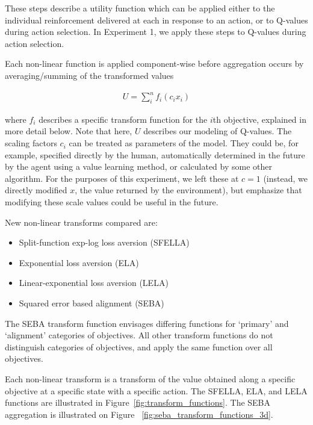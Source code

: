 These steps describe a utility function which can be applied either to the individual reinforcement delivered at each in response to an action, or to Q-values during action selection. In Experiment 1, we apply these steps to Q-values during action selection.

Each non-linear function is applied component-wise before aggregation occurs by averaging/summing of the transformed values

\begin{align}
\label{eq:meu}
U=\sum_{i}^n{f_i(c_i x_i)}
\end{align}

\noindent where ${f_i}$ describes a specific transform function for the $i$th objective, explained in more detail below. Note that here, $U$ describes our modeling of Q-values. The scaling factors $c_i$ can be treated as parameters of the model. They could be, for example, specified directly by the human, automatically determined in the future by the agent using a value learning method, or calculated by some other algorithm. 
For the purposes of this experiment, we left these at $c=1$ (instead, we directly modified $x$, the value returned by the environment), but emphasize that modifying these scale values could be useful in the future.


 New non-linear transforms compared are:

\begin{itemize}
    \item Split-function exp-log loss aversion (SFELLA)
    \item Exponential loss aversion (ELA)
    \item Linear-exponential loss aversion (LELA)
    \item Squared error based alignment (SEBA)
\end{itemize}

\noindent The SEBA transform function envisages differing functions for `primary' and `alignment' categories of objectives. All other transform functions do not distinguish categories of objectives, and apply the same function over all objectives.

Each non-linear transform is a transform of the value obtained along a specific objective %
at a specific state %
with a specific action. %
The SFELLA, ELA, and LELA functions are illustrated in Figure~\ref{fig:transform_functions}. The SEBA aggregation is illustrated on Figure ~\ref{fig:seba_transform_functions_3d}.

